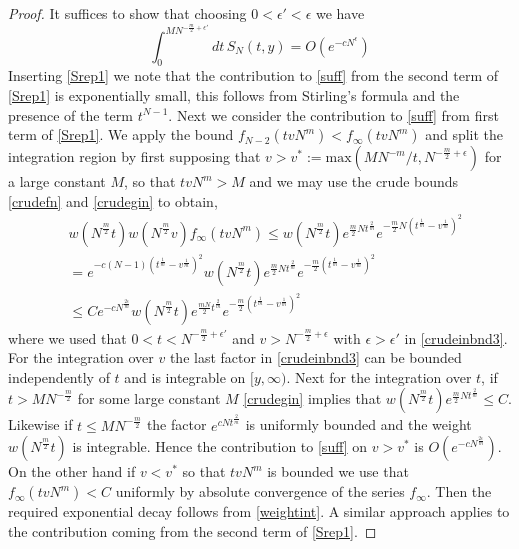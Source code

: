 \documentclass[11pt,reqno]{amsproc}
\numberwithin{equation}{section}
\numberwithin{theorem}{section}
\begin{document}
\begin{proof}
It suffices to show that choosing $0 < \epsilon' < \epsilon$ we have
\begin{equation}
\int_{0}^{MN^{-\frac{m}{2}+\epsilon'}}dt\,S_{N}(t,y) = O(e^{-cN^{\epsilon}}) \label{suff}
\end{equation}
Inserting \eqref{Srep1} we note that the contribution to \eqref{suff} from the second term of \eqref{Srep1} is exponentially small, this follows from Stirling's formula and the presence of the term $t^{N-1}$. Next we consider the contribution to \eqref{suff} from first term of \eqref{Srep1}. We apply the bound $f_{N-2}(tvN^{m}) < f_{\infty}(tvN^{m})$ and split the integration region by first supposing that $v > v^{*} := \mathrm{max}(MN^{-m}/t,N^{-\frac{m}{2}+\epsilon})$ for a large constant $M$, so that $tvN^{m} > M$ and we may use the crude bounds \eqref{crudefn} and \eqref{crudegin} to obtain,
\begin{align}
&w(N^{\frac{m}{2}}t)w(N^{\frac{m}{2}}v)f_{\infty}(tvN^{m}) \leq w(N^{\frac{m}{2}}t)e^{\frac{m}{2}Nt^{\frac{2}{m}}}e^{-\frac{m}{2}N(t^{\frac{1}{m}}-v^{\frac{1}{m}})^{2}}\\
&= e^{-c(N-1)(t^{\frac{1}{m}}-v^{\frac{1}{m}})^{2}}
w(N^{\frac{m}{2}}t)e^{\frac{m}{2}Nt^{\frac{2}{m}}}e^{-\frac{m}{2}(t^{\frac{1}{m}}-v^{\frac{1}{m}})^{2}} \label{crudeinbnd2}\\
&\leq Ce^{-cN^{\frac{2\epsilon}{m}}}w(N^{\frac{m}{2}}t)e^{\frac{mN}{2}t^{\frac{2}{m}}}e^{-\frac{m}{2}(t^{\frac{1}{m}}-v^{\frac{1}{m}})^{2}}
\label{crudeinbnd3}
\end{align}
where we used that $0 < t < N^{-\frac{m}{2}+\epsilon'}$ and $v > N^{-\frac{m}{2}+\epsilon}$ with $\epsilon > \epsilon'$ in \eqref{crudeinbnd3}. For the integration over $v$ the last factor in \eqref{crudeinbnd3} can be bounded independently of $t$ and is integrable on $[y,\infty)$. Next for the integration over $t$, if $t > MN^{-\frac{m}{2}}$ for some large constant $M$ \eqref{crudegin} implies that $w(N^{\frac{m}{2}}t)e^{\frac{m}{2}Nt^{\frac{2}{m}}} \leq C$. Likewise if $t \leq MN^{-\frac{m}{2}}$ the factor $e^{cNt^{\frac{2}{m}}}$ is uniformly bounded and the weight $w(N^{\frac{m}{2}}t)$ is integrable.   Hence the contribution to \eqref{suff} on $v > v^{*}$ is $O(e^{-cN^{\frac{2\epsilon}{m}}})$. On the other hand if $v < v^{*}$ so that $tvN^{m}$ is bounded we use that $f_{\infty}(tvN^{m}) < C$ uniformly by absolute convergence of the series $f_{\infty}$. Then the required exponential decay follows from \eqref{weightint}. A similar approach applies to the contribution coming from the second term of \eqref{Srep1}.
\end{proof}
\end{document}
